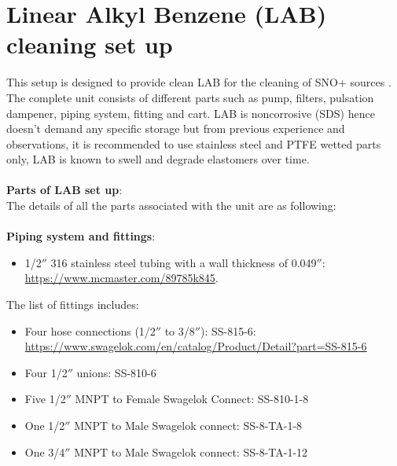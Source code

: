 \section{ Linear Alkyl Benzene (LAB) cleaning set up}
This setup is designed to provide clean LAB for the cleaning of SNO+ sources . The complete unit consists of different parts such as pump, filters, pulsation dampener, piping system, fitting and cart.  LAB is noncorrosive (SDS) hence doesn’t demand any specific storage but from previous experience and observations, it is recommended to use stainless steel and PTFE wetted parts only, LAB is known to swell and degrade elastomers over time. \\
\\
\textbf{Parts of LAB set up}:\\
The details of all the parts associated with the unit are as following:\\
\\
\textbf{Piping system and fittings}:\\
\begin{itemize}
\item  1/2$''$ 316 stainless steel tubing with a wall thickness of 0.049$''$: \url{https://www.mcmaster.com/89785k845}.
\end{itemize}

The list of fittings includes:\\
\begin{itemize}
\item Four hose connections (1/2$''$ to 3/8$''$): SS-815-6: \url{ https://www.swagelok.com/en/catalog/Product/Detail?part=SS-815-6}
\end{itemize}

\begin{itemize}
\item Four 1/2$''$ unions: SS-810-6 
\end{itemize}

\begin{itemize}
\item Five 1/2$''$ MNPT to Female Swagelok Connect: SS-810-1-8 
\end{itemize}

\begin{itemize}
\item One 1/2$''$  MNPT to Male Swagelok connect: SS-8-TA-1-8 
\end{itemize}

\begin{itemize}
\item One 3/4$''$ MNPT to Male Swagelok connect: SS-8-TA-1-12
\end{itemize}

